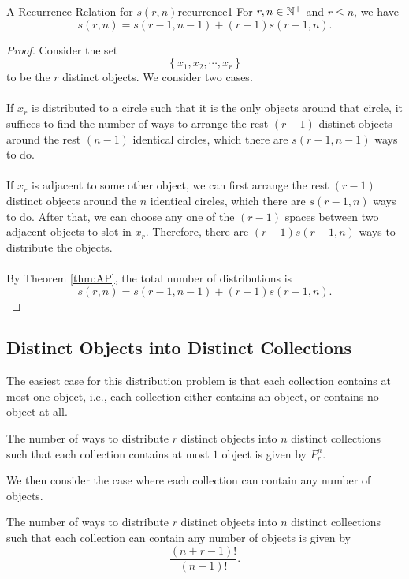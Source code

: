 \documentclass[math]{amznotes}
\theoremstyle{remark}
\begin{document}
\begin{thmbox}{A Recurrence Relation for $s(r, n)$}{recurrence1}
    For $r, n \in \mathbb{N}^+$ and $r \leq n$, we have
    \begin{equation*}
        s(r, n) = s(r - 1, n - 1) + (r - 1)s(r - 1, n).
    \end{equation*}
    \tcblower   
    \begin{proof}
        Consider the set
        \begin{displaymath}
            \left\{x_1, x_2, \cdots, x_r\right\}
        \end{displaymath}
        to be the $r$ distinct objects. We consider two cases.
        \\\\
        If $x_r$ is distributed to a circle such that it is the only objects around that circle, it suffices to find the number of ways to arrange the rest $(r - 1)$ distinct objects around the rest $(n - 1)$ identical circles, which there are $s(r - 1, n - 1)$ ways to do.
        \\\\
        If $x_r$ is adjacent to some other object, we can first arrange the rest $(r - 1)$ distinct objects around the $n$ identical circles, which there are $s(r - 1, n)$ ways to do. After that, we can choose any one of the $(r - 1)$ spaces between two adjacent objects to slot in $x_r$. Therefore, there are $(r - 1)s(r - 1, n)$ ways to distribute the objects.
        \\\\
        By Theorem \ref{thm:AP}, the total number of distributions is 
        \begin{equation*}
            s(r, n) = s(r - 1, n - 1) + (r - 1)s(r - 1, n).
        \end{equation*}
    \end{proof}
\end{thmbox}

\subsection{Distinct Objects into Distinct Collections}
The easiest case for this distribution problem is that each collection contains at most one object, i.e., each collection either contains an object, or contains no object at all.
\begin{probox}{}{}
    The number of ways to distribute $r$ distinct objects into $n$ distinct collections such that each collection contains at most $1$ object is given by $P^n_r$.
\end{probox}
We then consider the case where each collection can contain any number of objects.
\begin{probox}{}{}
    The number of ways to distribute $r$ distinct objects into $n$ distinct collections such that each collection can contain any number of objects is given by
    \begin{equation*}
        \frac{(n + r - 1)!}{(n - 1)!}.
    \end{equation*}
\end{probox}
\end{document}
